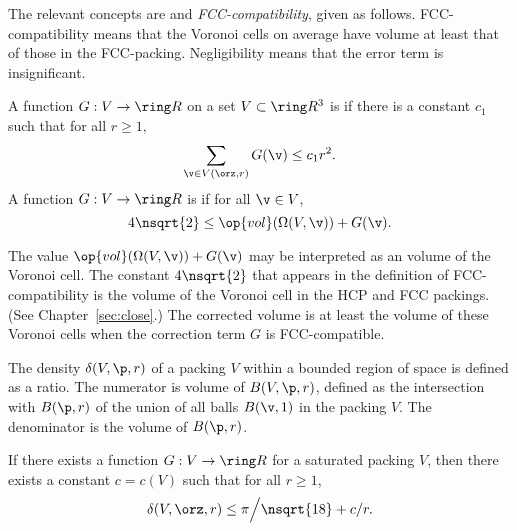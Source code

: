 \begin{cnl}
The relevant concepts are  and {\it
  FCC-compatibility}, given as follows.  FCC-compatibility means that
the Voronoi cells on average have volume at least that of those in the
FCC-packing.  Negligibility means that the error term is insignificant.


\begin{definition}
\label{def:negligible}
A function $G:V\to \Real$ on a set $V\subset\vecR{3}$
is 
if there is a constant $c_1$ such that for all $r\ge1$,
\[ \sumfinitepred{\v}{\v\in \Vee{V}(\orz,r)}{G(\v)} \le c_1
r^2.\] 
A function $G: V\to\Real$ is
if for all $\v\in V$, 
\[ 4\nsqrt{2}\le \op{vol}(\Omega(V,\v)) +
G(\v).\] 
%
\end{definition}


\begin{remark}
  The value $\op{vol}(\Omega(V,\v)) + G(\v)$ may be interpreted as an
   volume of the Voronoi cell. The constant
  $4\nsqrt{2}$ that appears in the definition of FCC-compatibility is
  the volume of the Voronoi cell in the HCP and FCC packings.  (See
  Chapter~\ref{sec:close}.)  The corrected volume is at least the
  volume of these Voronoi cells when the correction term $G$ is
  FCC-compatible.
%
%
\end{remark}

The density $\delta( V,\p,r)$ of a packing $ V$ within a bounded
region of space is defined as a ratio. The numerator is volume of
$\openBall{V}{\p,r}$, defined as the intersection with $\openBall{\p}{r}$ of the union
of all balls $\openBall{\v}{1}$ in the packing $V$.  The denominator is the volume of
$\openBall{\p}{r}$. 
%
%



\begin{lemma}
\label{lemma:reduction-finite-dimensions} %
% 
If there exists a 
 function $G: V\to\Real$ for
a saturated packing $ V$, then there exists a constant $c=c(V)$ such
that for all $r\ge1$,
\[  
\delta( V,\orz,r)
\le {\pi}\Big/{\nsqrt{18}} + c/r.
\] 
\end{lemma}



\end{cnl}
